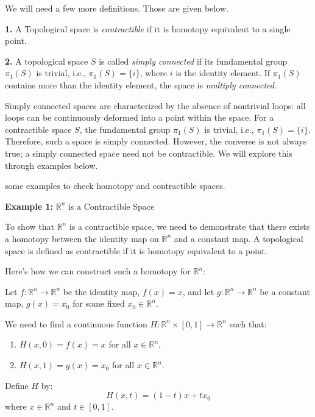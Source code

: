 \documentclass{article}
\begin{document}
We will need a few more definitions. Those are given below. 

\begin{theorem}
\textbf{1. } A Topological space is \textit{contractible} if it is homotopy equivalent to a single point.  

\textbf{2. } A topological space \( S \) is called \textit{simply connected} if its fundamental group \( \pi_1(S) \) is trivial, i.e., \( \pi_1(S) = \{i\} \), where \( i \) is the identity element. If \( \pi_1(S) \) contains more than the identity element, the space is \textit{multiply connected}.

\end{theorem}

Simply connected spaces are characterized by the absence of nontrivial loops: all loops can be continuously deformed into a point within the space. For a contractible space \( S \), the fundamental group \( \pi_1(S) \) is trivial, i.e., \( \pi_1(S) = \{i\} \). Therefore, such a space is simply connected. However, the converse is not always true; a simply connected space need not be contractible. We will explore this through examples below.

some examples to check homotopy and contractible spaces. 

\textbf{Example 1:} $\mathbb{R}^n$ is a Contractible Space

To show that $\mathbb{R}^n$ is a contractible space, we need to demonstrate that there exists a homotopy between the identity map on $\mathbb{R}^n$ and a constant map. A topological space is defined as contractible if it is homotopy equivalent to a point.

Here's how we can construct such a homotopy for $\mathbb{R}^n$:

Let $f: \mathbb{R}^n \to \mathbb{R}^n$ be the identity map, $f(x) = x$, and let $g: \mathbb{R}^n \to \mathbb{R}^n$ be a constant map, $g(x) = x_0$ for some fixed $x_0 \in \mathbb{R}^n$.

We need to find a continuous function $H: \mathbb{R}^n \times [0, 1] \to \mathbb{R}^n$ such that:
\begin{enumerate}
    \item $H(x, 0) = f(x) = x$ for all $x \in \mathbb{R}^n$,
    \item $H(x, 1) = g(x) = x_0$ for all $x \in \mathbb{R}^n$.
\end{enumerate}


Define $H$ by:
\[ H(x, t) = (1 - t)x + tx_0 \]
where $x \in \mathbb{R}^n$ and $t \in [0, 1]$.
\end{document}
